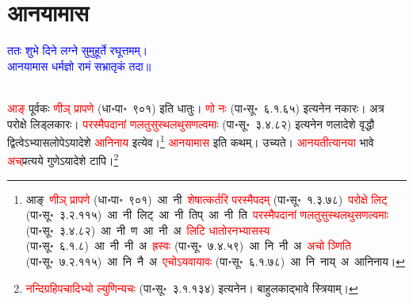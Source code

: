 \section[आनयामास]{आनयामास}
\centering\textcolor{blue}{ततः शुभे दिने लग्ने सुमुहूर्ते रघूत्तमम्।\nopagebreak\\
आनयामास धर्मज्ञो रामं सभ्रातृकं तदा॥}\nopagebreak\\
\\
\fontsize{14}{21}\selectfont\begin{sloppypar}\justifying\noindent\hspace{10mm} \textcolor{red}{आङ्} पूर्वकः \textcolor{red}{णीञ् प्रापणे} (धा॰पा॰~९०१) इति धातुः। \textcolor{red}{णो नः} (पा॰सू॰~६.१.६५) इत्यनेन नकारः। अत्र परोक्षे लिड्लकारः। \textcolor{red}{परस्मैपदानां णलतुसुस्थलथुस\-णल्वमाः} (पा॰सू॰~३.४.८२) इत्यनेन णलादेशे वृद्धौ द्वित्वेऽभ्यास\-लोपेऽयादेशे \textcolor{red}{आनिनाय} इत्येव।\footnote{आङ्~\textcolor{red}{णीञ् प्रापणे} (धा॰पा॰~९०१)~\arrow आ~नी~\arrow \textcolor{red}{शेषात्कर्तरि परस्मैपदम्} (पा॰सू॰~१.३.७८)~\arrow \textcolor{red}{परोक्षे लिट्} (पा॰सू॰~३.२.११५)~\arrow आ~नी~लिट्~\arrow आ~नी~तिप्~\arrow आ~नी~ति~\arrow \textcolor{red}{परस्मैपदानां णलतुसुस्थलथुस\-णल्वमाः} (पा॰सू॰~३.४.८२)~\arrow आ~नी~ण~\arrow आ~नी~अ~\arrow \textcolor{red}{लिटि धातोरनभ्यासस्य} (पा॰सू॰~६.१.८)~\arrow आ~नी~नी~अ~\arrow \textcolor{red}{ह्रस्वः} (पा॰सू॰~७.४.५९)~\arrow आ~नि~नी~अ~\arrow \textcolor{red}{अचो ञ्णिति} (पा॰सू॰~७.२.११५)~\arrow आ~नि~नै~अ~\arrow \textcolor{red}{एचोऽयवायावः} (पा॰सू॰~६.१.७८)~\arrow आ~नि~नाय्~अ~\arrow आनिनाय।} \textcolor{red}{आनयामास} इति कथम्। उच्यते।
\textcolor{red}{आनयतीत्यानया} भावे \textcolor{red}{अच्‌}\-प्रत्यये गुणेऽयादेशे टापि।\footnote{\textcolor{red}{नन्दि\-ग्रहि\-पचादिभ्यो ल्युणिन्यचः} (पा॰सू॰~३.१.१३४) इत्यनेन। बाहुलकाद्भावे स्त्रियाम्।}

\end{sloppypar}
